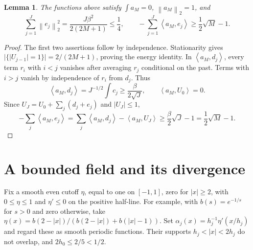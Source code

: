 \documentclass[11pt]{article}
\newtheorem{lemma}{Lemma}
\newcommand{\norm}[1]{\left\lVert#1\right\rVert}
\newcommand{\ip}[2]{\left\langle#1,#2\right\rangle}
\begin{document}
\begin{lemma}\label{lem:walk}
The functions above satisfy $\int a_M=0$, $\norm{a_M}_2=1$, and
\begin{equation}\label{eq:walkbounds}
 \sum_{j=1}^J\norm{e_j}_2^2
   =\frac{J\beta^2}{2(2M+1)}\leq\frac14,
 \qquad
 -\sum_{j=1}^J\ip{a_M}{e_j}\geq\frac12\sqrt M-1.
\end{equation}
\end{lemma}
\begin{proof}
The first two assertions follow by independence. Stationarity gives
$|\{|U_{j-1}|=1\}|=2/(2M+1)$, proving the energy identity.
In $\ip{a_M}{d_j}$, every term $r_i$ with $i<j$ vanishes after averaging
$r_j$ conditional on the past. Terms with $i>j$ vanish by independence
of $r_i$ from $d_j$. Thus
\[
 \ip{a_M}{d_j}=J^{-1/2}\int c_j\geq\frac\beta{2\sqrt J},
 \qquad \ip{a_M}{U_0}=0.
\]
Since $U_J=U_0+\sum_j(d_j+e_j)$ and $|U_J|\leq1$,
\[
 -\sum_j\ip{a_M}{e_j}
   =\sum_j\ip{a_M}{d_j}-\ip{a_M}{U_J}
   \geq\frac\beta2\sqrt J-1=\frac12\sqrt M-1.
\]
\end{proof}

\section{A bounded field and its divergence}

Fix a smooth even cutoff $\eta$, equal to one on $[-1,1]$, zero for
$|x|\geq2$, with $0\leq\eta\leq1$ and $\eta'\leq0$ on the positive
half-line. For example, with $b(s)=e^{-1/s}$ for $s>0$ and zero otherwise,
take $\eta(x)=b(2-|x|)/(b(2-|x|)+b(|x|-1))$.
Set $\alpha_j(x)=h_j^{-1}\eta'(x/h_j)$ and regard these as smooth periodic
functions. Their supports $h_j<|x|<2h_j$ do not overlap, and
$2h_0\leq2/5<1/2$.
\end{document}
